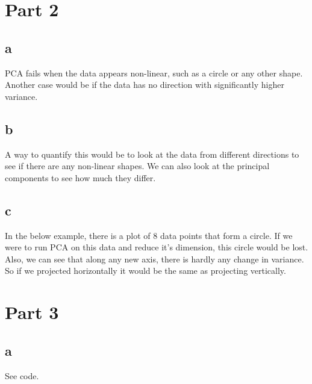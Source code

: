 \documentclass{article}
\begin{document}
\section{Part 2}


\subsection{a} PCA fails when the data appears non-linear, such as a circle or any other shape.
Another case would be if the data has no direction with significantly higher variance.

\subsection{b} A way to quantify this would be to look at the data from different directions to see if there are any non-linear shapes. We can also look at the principal components to see how much they differ.

\subsection{c}
In the below example, there is a plot of 8 data points that form a circle.
If we were to run PCA on this data and reduce it's dimension, this circle would be lost.
Also, we can see that along any new axis, there is hardly any change in variance. So if we projected horizontally it would be the same as projecting vertically.



\section{Part 3}

\subsection{a} See code.
\end{document}
